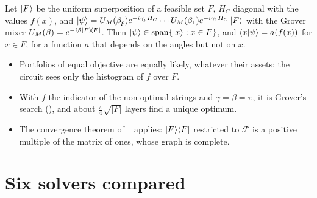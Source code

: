\documentclass[handoutsbeamer.tex]{subfiles}
\begin{document}
\begin{frame}
\onp{\footnotesize}
\begin{propn}\label{propn:ch13:grover}
Let $\ket F$ be the uniform superposition of a feasible set $F$, $H_C$ diagonal with the values $f(x)$, and $\ket\psi = U_M(\beta_p)e^{-i\gamma_pH_C}\cdots U_M(\beta_1)e^{-i\gamma_1H_C}\ket F$ with the Grover mixer $U_M(\beta) = e^{-i\beta\ket F\!\bra F}$. Then $\ket\psi\in\operatorname{span}\{\ket x:x\in F\}$, and $\braket{x|\psi} = a(f(x))$ for $x\in F$, for a function $a$ that depends on the angles but not on $x$.
\end{propn}

\begin{itemize}\setlength\itemsep{0.2em}
    \item Portfolios of equal objective are equally likely, whatever their assets: the circuit sees only the histogram of $f$ over $F$.
    \item With $f$ the indicator of the non-optimal strings and $\gamma = \beta = \pi$, it is Grover's search (), and about $\frac\pi4\sqrt{|F|}$ layers find a unique optimum.
    \item The convergence theorem of \Chap~ applies: $\ket F\!\bra F$ restricted to $\mathcal F$ is a positive multiple of the matrix of ones, whose graph is complete.
\end{itemize}
\end{frame}

\section{Six solvers compared}
\end{document}
